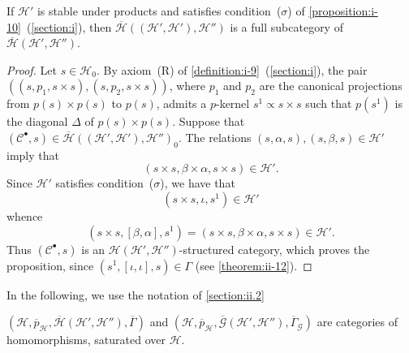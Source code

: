 \documentclass[a4paper,fleqn]{article}
\theoremstyle{plain}
\newenvironment{theorem}[1]
  {\renewcommand\theinnertheorem{#1}\innertheorem}
  {\endinnertheorem}
\newenvironment{proposition}[1]
  {\renewcommand\theinnerproposition{#1}\innerproposition}
  {\endinnerproposition}
\theoremstyle{definition}
\newcommand{\CC}{\mathcal{C}}
\newcommand{\HH}{\mathcal{H}}
\newcommand{\subs}{\mathrel{\propto}}
\newcommand{\GG}{\mathcal{G}}
\begin{document}
\begin{proposition}{29}
\label{proposition:ii-29}
  If $\HH'$ is stable under products and satisfies condition~($\sigma$) of \cref{proposition:i-10}~(\cref{section:i}), then $\overline{\HH}((\HH',\HH'),\HH'')$ is a full subcategory of $\overline{\HH}(\HH',\HH'')$.
\end{proposition}

\begin{proof}
  Let $s\in\HH_0$.
  By axiom~(R) of \cref{definition:i-9}~(\cref{section:i}), the pair $((s,p_1,s\times s),(s,p_2,s\times s))$, where $p_1$ and $p_2$ are the canonical projections from $p(s)\times p(s)$ to $p(s)$, admits a $p$-kernel $s^1\subs s\times s$ such that $p(s^1)$ is the diagonal $\Delta$ of $p(s)\times p(s)$.
  Suppose that $(\CC^\bullet,s)\in\overline{\HH}((\HH',\HH'),\HH'')_0$.
  The relations $(s,\alpha,s),(s,\beta,s)\in\HH'$ imply that
  \[
    (s\times s, \beta\times\alpha, s\times s)
    \in\HH'.
  \]
  Since $\HH'$ satisfies condition~($\sigma$), we have that
  \[
    (s\times s,\iota,s^1)\in\HH'
  \]
  whence
  \[
    (s\times s,[\beta,\alpha],s^1)
    = (s\times s,\beta\times\alpha,s\times s)
    \in\HH'.
  \]
  Thus $(\CC^\bullet,s)$ is an $\HH(\HH',\HH'')$-structured category, which proves the proposition, since $(s^1,[\iota,\iota],s)\in\Gamma$ (see \cref{theorem:ii-12}).
\end{proof}

In the following, we use the notation of \cref{section:ii.2}

\begin{theorem}{11}
\label{theorem:ii-11}
  $(\HH,\overline{p}_\HH,\overline{\HH}(\HH',\HH''),\overline{\Gamma})$ and $(\HH,\overline{p}_\HH,\overline{\GG}(\HH',\HH''),\overline{\Gamma}_\GG)$ are categories of homomorphisms, saturated over $\HH$.
\end{theorem}
\end{document}
